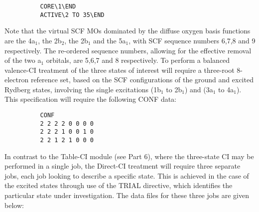 \documentclass[11pt,fleqn]{article}
\begin{document}
{
\footnotesize
\begin{verbatim}
          CORE\1\END
          ACTIVE\2 TO 35\END
\end{verbatim}
}
Note that the virtual SCF MOs dominated by the diffuse oxygen
basis functions are the 4a$_{1}$, the 2b$_{2}$, the 2b$_{1}$ and the
5a$_{1}$, with SCF sequence numbers 6,7,8 and 9 respectively. 
The  re-ordered sequence numbers, allowing for the
effective removal of the two a$_{1}$ orbitals, are 5,6,7 and 8
respectively.
To perform a balanced valence-CI treatment of the three states 
of interest will require a three-root 8-electron  reference set,
based on the SCF configurations of the ground and 
excited Rydberg states, involving the single excitations
(1b$_{1}$ to 2b$_{1}$) and (3a$_{1}$ to 4a$_{1}$). This specification
will require the following CONF data:

{
\footnotesize
\begin{verbatim}
          CONF
          2 2 2 2 0 0 0 0
          2 2 2 1 0 0 1 0
          2 2 1 2 1 0 0 0
\end{verbatim}
}
In contrast to the Table-CI module (see Part 6), where 
the three-state CI may be performed in a single job, the Direct-CI
treatment will require three separate jobs, each job looking
to describe a specific state. This is achieved in the case
of the excited states through use of the
TRIAL directive, which identifies the particular state
under investigation. The data files for these three jobs 
are given below:\\
\end{document}
